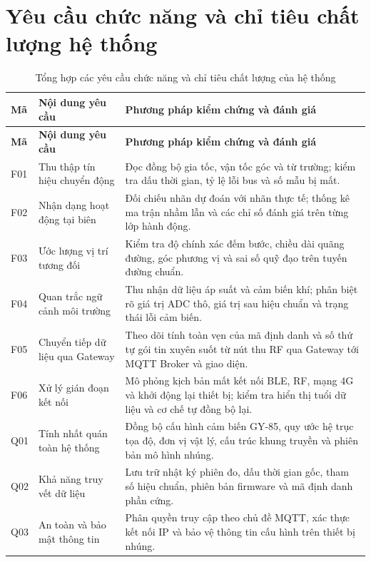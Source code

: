 \section{Yêu cầu chức năng và chỉ tiêu chất lượng hệ thống}
\begingroup\SmallTable
\begin{longtable}{|P{35bp}|P{130bp}|P{243bp}|}
\caption{Tổng hợp các yêu cầu chức năng và chỉ tiêu chất lượng của hệ thống}\label{tab:requirements}\\\hline
\textbf{Mã}&\textbf{Nội dung yêu cầu}&\textbf{Phương pháp kiểm chứng và đánh giá}\\\hline\endfirsthead
\hline\textbf{Mã}&\textbf{Nội dung yêu cầu}&\textbf{Phương pháp kiểm chứng và đánh giá}\\\hline\endhead
F01&Thu thập tín hiệu chuyển động&Đọc đồng bộ gia tốc, vận tốc góc và từ trường; kiểm tra dấu thời gian, tỷ lệ lỗi bus và số mẫu bị mất.\\\hline
F02&Nhận dạng hoạt động tại biên&Đối chiếu nhãn dự đoán với nhãn thực tế; thống kê ma trận nhầm lẫn và các chỉ số đánh giá trên từng lớp hành động.\\\hline
F03&Ước lượng vị trí tương đối&Kiểm tra độ chính xác đếm bước, chiều dài quãng đường, góc phương vị và sai số quỹ đạo trên tuyến đường chuẩn.\\\hline
F04&Quan trắc ngữ cảnh môi trường&Thu nhận dữ liệu áp suất và cảm biến khí; phân biệt rõ giá trị ADC thô, giá trị sau hiệu chuẩn và trạng thái lỗi cảm biến.\\\hline
F05&Chuyển tiếp dữ liệu qua Gateway&Theo dõi tính toàn vẹn của mã định danh và số thứ tự gói tin xuyên suốt từ nút thu RF qua Gateway tới MQTT Broker và giao diện.\\\hline
F06&Xử lý gián đoạn kết nối&Mô phỏng kịch bản mất kết nối BLE, RF, mạng 4G và khởi động lại thiết bị; kiểm tra hiển thị tuổi dữ liệu và cơ chế tự đồng bộ lại.\\\hline
Q01&Tính nhất quán toàn hệ thống&Đồng bộ cấu hình cảm biến GY-85, quy ước hệ trục tọa độ, đơn vị vật lý, cấu trúc khung truyền và phiên bản mô hình nhúng.\\\hline
Q02&Khả năng truy vết dữ liệu&Lưu trữ nhật ký phiên đo, dấu thời gian gốc, tham số hiệu chuẩn, phiên bản firmware và mã định danh phần cứng.\\\hline
Q03&An toàn và bảo mật thông tin&Phân quyền truy cập theo chủ đề MQTT, xác thực kết nối IP và bảo vệ thông tin cấu hình trên thiết bị nhúng.\\\hline
\end{longtable}\endgroup

